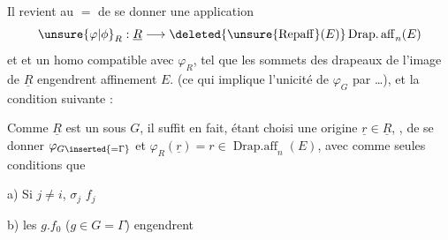 Il revient au $=$ de se donner une application
\[
\unsure{\varphi|\phi}_R:\underline{R}\longrightarrow\deleted{\unsure{\operatorname{Repaff}}(E)}\operatorname{Drap.aff}_n(E)
\]
et  et un  homo
compatible avec $\varphi_R$, tel que les sommets des  drapeaux de l'image de $\underline{R}$ engendrent affinement $E$. (ce qui implique l'unicité de $\varphi_G$  par  \dots), et la condition suivante :


Comme $\underline{R}$ est un  sous $G$, il suffit en fait, étant choisi une origine $\underline{r}\in\underline{R}$, , de se donner $\varphi_{G\inserted{=\Gamma}}$ et $\varphi_R(\underline{r})=r\in\operatorname{Drap.aff}_n(E)$, avec comme seules conditions que

a) \deleted{$\unsure{\{}$} Si $j\neq i$, $\sigma_j$  $f_j$

b) les $g.f_0$ ($g\in G=\Gamma$) engendrent 
